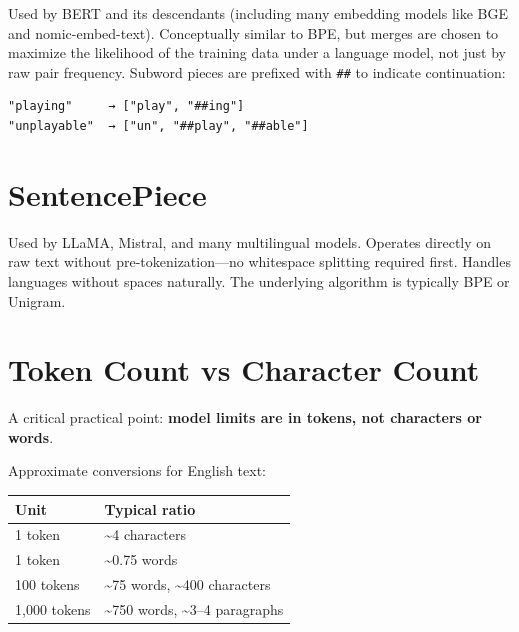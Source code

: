 Used by BERT and its descendants (including many embedding models like BGE and
nomic-embed-text). Conceptually similar to BPE, but merges are chosen to maximize the
likelihood of the training data under a language model, not just by raw pair frequency.
Subword pieces are prefixed with \texttt{\#\#} to indicate continuation:

\begin{Verbatim}
"playing"     → ["play", "##ing"]
"unplayable"  → ["un", "##play", "##able"]
\end{Verbatim}

\section{SentencePiece}

Used by LLaMA, Mistral, and many multilingual models. Operates directly on raw text without
pre-tokenization---no whitespace splitting required first. Handles languages without spaces
naturally. The underlying algorithm is typically BPE or Unigram.

\section{Token Count vs Character Count}

A critical practical point: \textbf{model limits are in tokens, not characters or words}.

Approximate conversions for English text:

\begin{center}
\begin{tabular}{ll}
\toprule
\textbf{Unit} & \textbf{Typical ratio} \\
\midrule
1 token & \textasciitilde4 characters \\
1 token & \textasciitilde0.75 words \\
100 tokens & \textasciitilde75 words, \textasciitilde400 characters \\
1{,}000 tokens & \textasciitilde750 words, \textasciitilde3--4 paragraphs \\
\bottomrule
\end{tabular}
\end{center}

